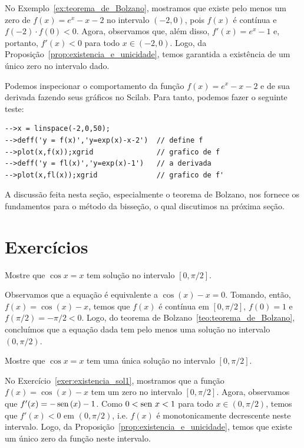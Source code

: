 \begin{ex}
No Exemplo~\ref{ex:teorema_de_Bolzano}, mostramos que existe pelo menos um zero de $f(x) = e^{x}-x-2$ no intervalo $(-2,0)$, pois $f(x)$ é contínua e $f(-2)\cdot f(0) < 0$. Agora, observamos que, além disso, $f'(x)=e^x-1$ e, portanto, $f'(x)<0$ para todo $x\in(-2,0)$. Logo, da Proposição~\ref{prop:existencia_e_unicidade}, temos garantida a existência de um único zero no intervalo dado.

\ifisscilab
Podemos inspecionar o comportamento da função $f(x)= e^x - x - 2$ e de sua derivada fazendo seus gráficos no Scilab. Para tanto, podemos fazer o seguinte teste:
\begin{verbatim}
-->x = linspace(-2,0,50);
-->deff('y = f(x)','y=exp(x)-x-2')  // define f
-->plot(x,f(x));xgrid               // grafico de f
-->deff('y = fl(x)','y=exp(x)-1')   // a derivada
-->plot(x,fl(x));xgrid              // grafico de f'
\end{verbatim}
\fi
\end{ex}

A discussão feita nesta seção, especialmente o teorema de Bolzano, nos fornece os fundamentos para o método da bisseção, o qual discutimos na próxima seção.

\section*{Exercícios}

\begin{Exercise}\label{exer:existencia_sol1}
  Mostre que $\cos x = x$ tem solução no intervalo $[0, \pi/2]$.
\end{Exercise}
\begin{Answer}
  \begin{tiny}
  Observamos que a equação é equivalente a $\cos(x) - x = 0$. Tomando, então, $f(x) = \cos(x) - x$, temos que $f(x)$ é contínua em $[0, \pi/2]$, $f(0) = 1$ e $f(\pi/2) = -\pi/2 < 0$. Logo, do teorema de Bolzano~\ref{teo:teorema_de_Bolzano}, concluímos que a equação dada tem pelo menos uma solução no intervalo $(0, \pi/2)$.    
  \end{tiny}
\end{Answer}

\begin{Exercise}
  Mostre que $\cos x = x$ tem uma única solução no intervalo $[0, \pi/2]$.
\end{Exercise}
\begin{Answer}
  \begin{tiny}
    No Exercício~\ref{exer:existencia_sol1}, mostramos que a função $f(x) = \cos(x) - x$ tem um zero no intervalo $[0, \pi/2]$. Agora, observamos que $f'(x) = -\operatorname{sen}\,(x) - 1$. Como $0 < \operatorname{sen}\, x < 1$ para todo $x\in (0, \pi/2)$, temos que $f'(x) < 0$ em $(0, \pi/2)$, i.e. $f(x)$ é monotonicamente decrescente neste intervalo. Logo, da Proposição~\ref{prop:existencia_e_unicidade}, temos que existe um único zero da função neste intervalo.
  \end{tiny}
\end{Answer}

